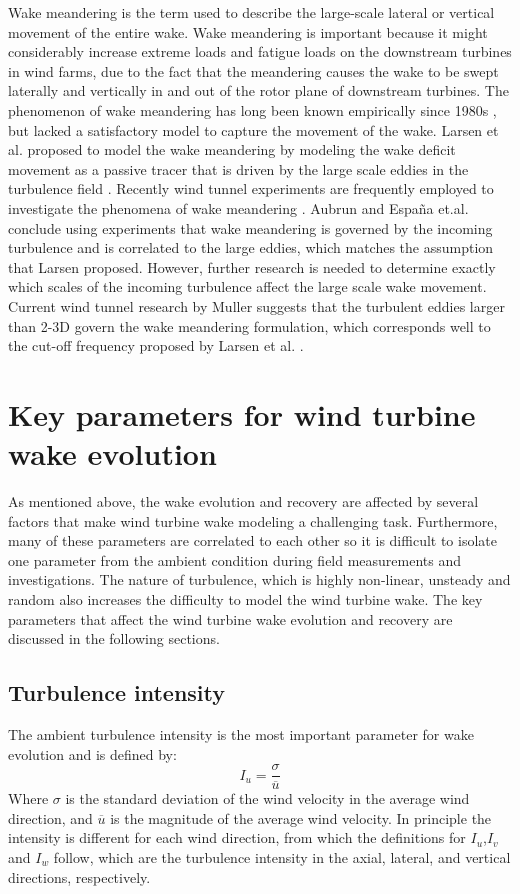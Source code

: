 \documentclass{umthesis}
\begin{document}
Wake meandering is the term used to describe the large-scale lateral or vertical movement of the entire wake. Wake meandering is important because it might considerably increase extreme loads and fatigue loads on the downstream turbines in wind farms, due to the fact that the meandering causes the wake to be swept laterally and vertically in and out of the rotor plane of downstream turbines. The phenomenon of wake meandering has long been known empirically since 1980s \cite{Ainslie_flow}\cite{Ainslie_wake}, but lacked a satisfactory model to capture the movement of the wake. Larsen et al. proposed to model the wake meandering by modeling the wake deficit movement as a passive tracer that is driven by the large scale eddies in the turbulence field \cite{Larsen_meandering}. Recently wind tunnel experiments are frequently employed to investigate the phenomena of wake meandering \cite{Medici}. Aubrun\cite{Aubrun} and España et.al. \cite{España_Spatial}\cite{España_tunnel} conclude using experiments that wake meandering is governed by the incoming turbulence and is correlated to the large eddies, which matches the assumption that Larsen proposed. However, further research is needed to determine exactly which scales of the incoming turbulence affect the large scale wake movement. Current wind tunnel research by Muller \cite{Müller} suggests that the turbulent eddies larger than 2-3D govern the wake meandering formulation, which corresponds well to the cut-off frequency proposed by Larsen et al. \cite{Larsen_meandering}.




\section{Key parameters for wind turbine wake evolution}
As mentioned above, the wake evolution and recovery are affected by several factors that make wind turbine wake modeling a challenging task. Furthermore, many of these parameters are correlated to each other so it is difficult to isolate one parameter from the ambient condition during field measurements and investigations. The nature of turbulence, which is highly non-linear, unsteady and random also increases the difficulty to model the wind turbine wake. The key parameters that affect the wind turbine wake evolution and recovery are discussed in the following sections.


\subsection{Turbulence intensity}
The ambient turbulence intensity is the most important parameter for wake evolution and is defined by:
\begin{equation}
  I_u=\frac{\sigma}{\overline{u}}
\end{equation}
Where $\sigma$ is the standard deviation of the wind velocity in the average wind direction, and $\overline{u}$ is the magnitude of the average wind velocity. In principle the intensity is different for each wind direction, from which the definitions for $I_u$,$I_v$ and $I_w$ follow, which are the turbulence intensity in the axial, lateral, and vertical directions, respectively.
\end{document}
